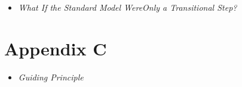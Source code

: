 \vspace{1em}
\begin{tcolorbox}[title=Hypothetical Boxes, hypobox]
	\begin{itemize}
		\item \emph{What If the Standard Model Were\newline Only a Transitional Step?} \dotfill\pageref{Merksatz zum Photon}
	\end{itemize}
\end{tcolorbox}


\section{Appendix C}
\vspace{1em}
\begin{tcolorbox}[title=Didactic Boxes, didaktikbox]
		\label{box:guiding_principle}
	\begin{itemize}
		\item \emph{Guiding Principle} \dotfill	\pageref{box:guiding_principle}
	\end{itemize}
\end{tcolorbox}
